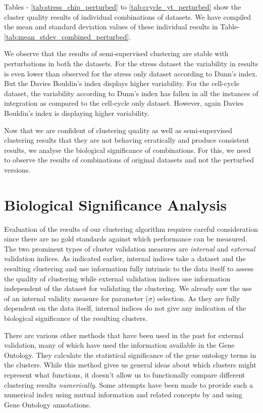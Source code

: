 Tables - \ref{tab:stress_chip_perturbed} to \ref{tab:ccycle_yt_perturbed} show the cluster quality results of individual combinations of datasets. We have compiled the mean 
and standard deviation values of these individual results in Table-\ref{tab:mean_stdev_combined_perturbed}. 

We observe that the results of semi-supervised clustering are stable with perturbations in both the datasets. For the stress dataset the variability in results is even lower than
 observed for the stress only dataset according to Dunn's index. But the Davies Bouldin's index displays higher variability. For the cell-cycle dataset, the variability according to Dunn's
 index has fallen in all the instances of integration as compared to the cell-cycle only dataset. However, again Davies Bouldin's index is displaying higher variability.
  
Now that we are confident of clustering quality as well as semi-supervised clustering results that they are not behaving erratically and produce consistent results, 
we analyse the biological significance of combinations. For this, we need to observe the results of combinations of original datasets 
and not the perturbed versions. 

\section{Biological Significance Analysis}
Evaluation of the results of our clustering algorithm requires careful consideration since there are no gold standards against which performance can be measured. 
The two prominent types of cluster validation measures are \textit{internal} and \textit{external} validation indices. As indicated earlier, internal indices take a dataset and 
the resulting clustering and use information fully intrinsic to the data itself to assess the quality of clustering while external validation indices use information independent 
of the dataset for validating the clustering. We already saw the use of an internal validity measure for parameter ($\sigma$) selection. As they are fully dependent on the 
data itself, internal indices do not give any indication of the biological significance of the resulting clusters.  

There are various other methods that have been used in the past for external validation, many of which have used the information available in the Gene Ontology. 
They calculate the statistical significance of the gene ontology terms in the clusters. While this method gives us general ideas about which clusters might represent 
what functions, it doesn't allow us to functionally compare different clustering results \textit{numerically}. Some attempts have been made to provide 
such a numerical index using mutual information and related concepts by \citet{Gibons2002Judging} and \citet{gatviks03scoring} using Gene Ontology annotations. 

